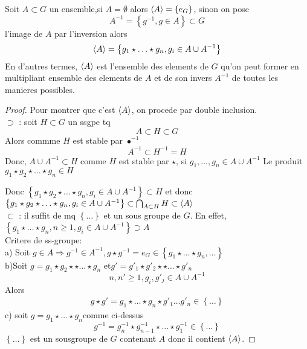 \documentclass[../main.tex]{subfiles}
\begin{document}
\begin{thm}
	Soit $A\subset G$ un ensemble,si $A=\emptyset$ alors $\left\langle A\right\rangle= \left\{ e_G \right\}$, sinon on pose
	\[ 
	A^{-1}= \left\{ g^{-1}, g\in A \right\} \subset G
	\]
	l'image de $A$ par l'inversion alors
	\[ 
		\left\langle A\right\rangle = \left\{ g_1\star\ldots\star g_n, g_i \in A \cup A^{-1} \right\} 
	\]
	En d'autres termes, $\left\langle A\right\rangle$ est l'ensemble des elements de $G$ qu'on peut former en multipliant ensemble des elements de $A$ et de son invers $A^{-1}$ de toutes les manieres possibles.
\end{thm}
\begin{proof}
	Pour montrer que c'est $\left\langle A\right\rangle$, on procede par double inclusion.\\
	$\supset$ : soit $H\subset G$ un ssgpe tq
	\[ 
	A\subset H \subset G
	\]
	Alors commme $H$ est stable par $\bullet^{-1}$	
	\[ 
	A^{-1}\subset H^{-1} =H
	\]
	Donc, $A\cup A^{-1}\subset H$ comme $H$ est stable par $\star$, si $ g_1,\ldots,g_n\in A\cup A^{-1}$
	Le produit $ g_1\star g_2\star\ldots\star g_n \in H$
	
	Donc $ \left\{ g_1\star g_2\star \ldots \star g_n, g_i \in A\cup A^{-1} \right\} \subset H $
	et donc $ \left\{ g_1\star g_2\star \ldots \star g_n, g_i \in A\cup A^{-1} \right\} \subset \bigcap_{A\subset H} H \subset \left\langle A\right\rangle $\\
	$\subset$ : il suffit de mq $ \left\{ \ldots \right\} $ et un sous groupe de $G$.
	En effet, $ \left\{ g_1\star \ldots\star g_n, n\geq 1, g_i \in A\cup A^{-1} \right\} \supset A $\\
	Critere de ss-groupe:\\
	a) Soit $g\in A \Rightarrow g^{-1} \in A^{-1}, g\star g^{-1} = e_G \in \left\{ g_1\star\ldots\star g_n, \ldots \right\} $\\
	b)Soit $g=g_1\star g_2\star\star\ldots \star g_n$ et$g'=g'_1\star g'_2\star\star\ldots \star g'_n$\\
	\[ 
	n,n'\geq 1, g_i, g'_j \in A \cup A^{-1}
	\]
	Alors
	\begin{align*}
	g\star g' = g_1\star\ldots\star g_n\star g'_1\ldots g'_n \in \left\{ \ldots \right\} 	
	\end{align*}
	c) soit $g=g_1\star\ldots\star g_n$comme ci-dessus
	\[ 
	g^{-1}= g_n^{-1}\star g_{n-1} ^{-1}\star\ldots\star g_1^{-1} \in \left\{ \ldots \right\} 
	\]
	$ \left\{ \ldots \right\} $ est un sousgroupe de $G$ contenant $A$ donc il contient $\left\langle A\right\rangle$.
\end{proof}
\end{document}
